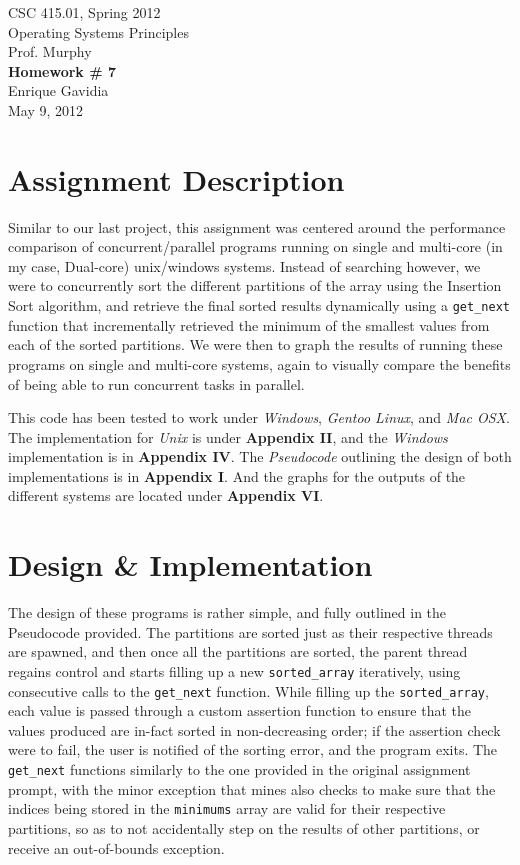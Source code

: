 \documentclass[12pt]{article}
\def \name       {Enrique Gavidia}
\def \coursenum  {CSC 415.01}
\def \coursename {Operating Systems Principles}
\def \instructor {Prof. Murphy}
\def \semester   {Spring 2012}
\def \assignment {Homework \# 7}
\def \duedate    {May 9, 2012}
\newcommand {\makecover} {
  \begin{titlepage}
    \begin{center}
      \LARGE{\coursenum, \semester \\ \coursename}\\
      \Large{\instructor}\\
      \vfill
      \textbf{\Huge \assignment}\\
      \vfill
      \Large{\name}\\
      \large{\duedate}
    \end{center}
  \end{titlepage}
}
\begin{document}
\makecover

\section*{Assignment Description}
Similar to our last project, this assignment was centered around the performance comparison of concurrent/parallel programs running 
on single and multi-core (in my case, Dual-core) unix/windows systems. Instead of searching however, we were to concurrently sort the 
different partitions of the array using the Insertion Sort algorithm, and retrieve the final sorted results dynamically using a 
\texttt{get\_next} function that incrementally retrieved the minimum of the smallest values from each of the sorted partitions. We were 
then to graph the results of running these programs on single and multi-core systems, again to visually compare the benefits of being able 
to run concurrent tasks in parallel. 

 
This code has been tested to work under \textsl{Windows}, \textsl{Gentoo Linux}, and \textsl{Mac OSX}.
The implementation for \textsl{Unix} is under \textbf{Appendix II}, and the \textsl{Windows} implementation is in \textbf{Appendix IV}. 
The \textsl{Pseudocode} outlining the design of both implementations is in \textbf{Appendix I}.
And the graphs for the outputs of the different systems are located under \textbf{Appendix VI}.


\section*{Design \& Implementation}
The design of these programs is rather simple, and fully outlined in the Pseudocode provided. The partitions are sorted just as their
respective threads are spawned, and then once all the partitions are sorted, the parent thread regains control and starts filling up
a new \texttt{sorted\_array} iteratively, using consecutive calls to the \texttt{get\_next} function. While filling up the \texttt{sorted\_array},
each value is passed through a custom assertion function to ensure that the values produced are in-fact sorted in non-decreasing order; if
the assertion check were to fail, the user is notified of the sorting error, and the program exits.  The \texttt{get\_next} functions similarly
to the one provided in the original assignment prompt, with the minor exception that mines also checks to make sure that the indices being
stored in the \texttt{minimums} array are valid for their respective partitions, so as to not accidentally step on the results of other 
partitions, or receive an out-of-bounds exception.
\end{document}

